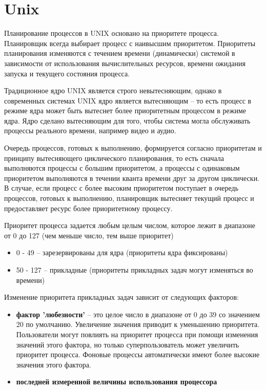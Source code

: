 \section{Unix}

Планирование процессов в UNIX основано на приоритете процесса. Планировщик всегда выбирает процесс с наивысшим приоритетом. Приоритеты планирования изменяются с течением времени (динамически) системой в зависимости от использования вычислительных ресурсов, времени ожидания запуска и текущего состояния процесса. 

Традиционное ядро UNIX является строго невытесняющим, однако в современных системах UNIX ядро является вытесняющим -- то есть процесс в режиме ядра может быть вытеснет более приоритетным процессом в режиме ядра. Ядро сделано вытесняющим для того, чтобы система могла обслуживать процессы реального времени, например видео и аудио.

Очередь процессов, готовых к выполнению, формируется согласно приоритетам и принципу вытесняющего циклического планирования, то есть сначала выполняются процессы с большим приоритетом, а процессы с одинаковым приоритетом выполняются в течении кванта времени друг за другом циклически. В случае, если процесс с более высоким приоритетом поступает в очередь процессов, готовых к выполнению, планировщик вытесняет текущий процесс и предоставляет ресурс более приоритетному процессу.

Приоритет процесса задается любым целым числом, которое лежит в диапазоне от 0 до 127 (чем меньше число, тем выше приоритет)
\begin{itemize}
	\item 0 - 49 -- зарезервированы для ядра (приоритеты ядра фиксированы)
	\item 50 - 127 -- прикладные  (приоритеты прикладных задач могут изменяться во времени)
\end{itemize}

Изменение приоритета прикладных задач зависит от следующих факторов:
\begin{itemize}
	\item \textbf{фактор 'любезности'} -- это целое число в диапазоне от 0 до 39 со значением 20 по умолчанию. Увеличение значения приводит к уменьшению приоритета. Пользователи могут повлиять на приоритет процесса при помощи изменения значений этого фактора, но только суперпользователь может увеличить приоритет процесса. Фоновые процессы автоматически имеют более высокие значения этого фактора.
	\item \textbf{последней измеренной величины использования процессора} 
\end{itemize}


